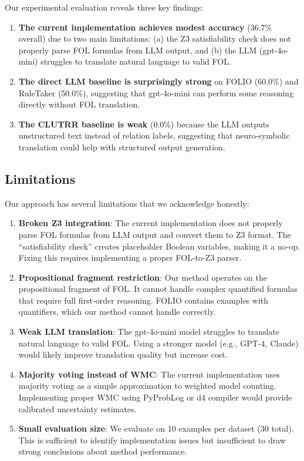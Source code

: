 \documentclass[11pt,letterpaper]{article}
\begin{document}
Our experimental evaluation reveals three key findings:

\begin{enumerate}
    \item \textbf{The current implementation achieves modest accuracy} (36.7\% overall) due to two main limitations: (a) the Z3 satisfiability check does not properly parse FOL formulas from LLM output, and (b) the LLM (gpt-4o-mini) struggles to translate natural language to valid FOL.
    
    \item \textbf{The direct LLM baseline is surprisingly strong} on FOLIO (60.0\%) and RuleTaker (50.0\%), suggesting that gpt-4o-mini can perform some reasoning directly without FOL translation.
    
    \item \textbf{The CLUTRR baseline is weak} (0.0\%) because the LLM outputs unstructured text instead of relation labels, suggesting that neuro-symbolic translation could help with structured output generation.
\end{enumerate}

\subsection{Limitations}

Our approach has several limitations that we acknowledge honestly:

\begin{enumerate}
    \item \textbf{Broken Z3 integration}: The current implementation does not properly parse FOL formulas from LLM output and convert them to Z3 format. The ``satisfiability check'' creates placeholder Boolean variables, making it a no-op. Fixing this requires implementing a proper FOL-to-Z3 parser.
    
    \item \textbf{Propositional fragment restriction}: Our method operates on the propositional fragment of FOL. It cannot handle complex quantified formulas that require full first-order reasoning. FOLIO contains examples with quantifiers, which our method cannot handle correctly.
    
    \item \textbf{Weak LLM translation}: The gpt-4o-mini model struggles to translate natural language to valid FOL. Using a stronger model (e.g., GPT-4, Claude) would likely improve translation quality but increase cost.
    
    \item \textbf{Majority voting instead of WMC}: The current implementation uses majority voting as a simple approximation to weighted model counting. Implementing proper WMC using PyProbLog or d4 compiler would provide calibrated uncertainty estimates.
    
    \item \textbf{Small evaluation size}: We evaluate on 10 examples per dataset (30 total). This is sufficient to identify implementation issues but insufficient to draw strong conclusions about method performance.
\end{enumerate}
\end{document}
